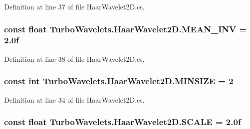 Definition at line 37 of file Haar\+Wavelet2\+D.\+cs.

\hypertarget{class_turbo_wavelets_1_1_haar_wavelet2_d_aca358f40b15421e2ad216236fa000cce}{
\subsubsection[{M\+E\+A\+N\+\_\+\+I\+N\+V}]{\setlength{\rightskip}{0pt plus 5cm}const float Turbo\+Wavelets.\+Haar\+Wavelet2\+D.\+M\+E\+A\+N\+\_\+\+I\+N\+V = 2.\+0f\hspace{0.3cm}{\ttfamily [protected]}}}\label{class_turbo_wavelets_1_1_haar_wavelet2_d_aca358f40b15421e2ad216236fa000cce}


Definition at line 38 of file Haar\+Wavelet2\+D.\+cs.

\hypertarget{class_turbo_wavelets_1_1_haar_wavelet2_d_a841ed0ce87560b5a4e5b94e4b2630765}{
\subsubsection[{M\+I\+N\+S\+I\+Z\+E}]{\setlength{\rightskip}{0pt plus 5cm}const int Turbo\+Wavelets.\+Haar\+Wavelet2\+D.\+M\+I\+N\+S\+I\+Z\+E = 2\hspace{0.3cm}{\ttfamily [protected]}}}\label{class_turbo_wavelets_1_1_haar_wavelet2_d_a841ed0ce87560b5a4e5b94e4b2630765}


Definition at line 34 of file Haar\+Wavelet2\+D.\+cs.

\hypertarget{class_turbo_wavelets_1_1_haar_wavelet2_d_a1c6cc94e0c41dd74fc3c8f7e36bf123f}{
\subsubsection[{S\+C\+A\+L\+E}]{\setlength{\rightskip}{0pt plus 5cm}const float Turbo\+Wavelets.\+Haar\+Wavelet2\+D.\+S\+C\+A\+L\+E = 2.\+0f\hspace{0.3cm}{\ttfamily [protected]}}}\label{class_turbo_wavelets_1_1_haar_wavelet2_d_a1c6cc94e0c41dd74fc3c8f7e36bf123f}


